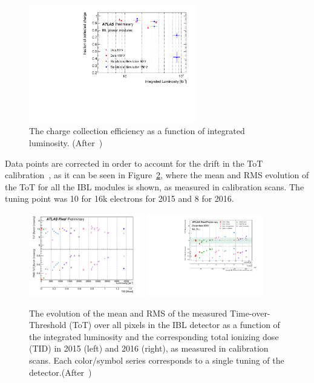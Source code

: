 \begin{figure}[htpb!]
\centering
\includegraphics[width=0.65\textwidth]{CCE_Run2_approved.pdf}
\caption{The charge collection efficiency as a function of integrated luminosity. (After~\cite{Rossini:2273193})}
\label{fig:CCE:Run2}
\end{figure}



Data points are corrected in order to account for the drift in the ToT calibration~\cite{Miucci:2129027,Higashino:2252674}, as it can be seen in Figure~\ref{fig:ToTCalibrationDrift}, where the mean and RMS evolution of the ToT for all the IBL modules is shown, as measured in calibration scans. The tuning point was 10  for 16k electrons for 2015 and 8 for 2016. 

\begin{figure}[!htpb]
\centering
\includegraphics[width=0.45\textwidth]{2015Calibration.pdf}
\includegraphics[width=0.45\textwidth]{2016Calibration.pdf}
\caption{The evolution of the mean and RMS of the measured Time-over-Threshold (ToT) over all pixels in the IBL detector as a function of the integrated luminosity and the corresponding total ionizing dose (TID) in 2015 (left) and 2016 (right), as measured in calibration scans. Each color/symbol series corresponds to a single tuning of the detector.(After~\cite{Miucci:2129027,Higashino:2252674})
\label{fig:ToTCalibrationDrift}}
\end{figure}



